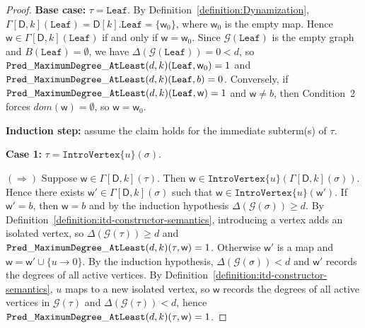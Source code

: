 \documentclass[11pt,a4paper]{article}
\newcommand{\falsevalue}{0}
\newcommand{\truevalue}{1}
\newcommand{\treewidthvalue}{k}
\newcommand{\decompositiongraph}[1]{\mathcal{G}(#1)}
\newcommand{\maxDegree}{\Delta}
\newcommand{\introvertextype}[1]{\mathtt{IntroVertex}\{#1\}}
\newcommand{\leaftype}{\mathtt{Leaf}}
\newcommand{\initialsetgeneric}{\mathtt{Leaf}}
\newcommand{\topbagname}{B}
\newcommand{\topbag}[1]{\topbagname(#1)}
\newcommand{\abstractdecomposition}{\tau}
\newcommand{\sigmaabstractdecomposition}{\sigma}
\newcommand{\vertexone}{u}
\newcommand{\awitness}{\mathsf{w}}
\newcommand{\dpcore}{\mathsf{D}}
\newcommand{\dpNamePart}[1]{\mbox{\normalfont\ttfamily #1}}
\newcommand{\predicateMaxDegree}[2]{\dpNamePart{Pred}\_\allowbreak\dpNamePart{MaximumDegree}\_\allowbreak\dpNamePart{AtLeast}(#1,#2)}
\newcommand{\dynamizationfunctionname}[1]{\Gamma[{#1}]}
\newcommand{\dynamizationfunction}[2]{\dynamizationfunctionname{#1,#2}}
\newcommand{\domain}{dom}
\newcommand{\maxdegreeparameter}{d}
\newcommand{\maxdegreefound}{b}
\newcommand{\mxdp}{\predicateMaxDegree{\maxdegreeparameter}{\treewidthvalue}}
\begin{document}
{\begin{proof}
\medskip
\noindent\textbf{Base case:} $\abstractdecomposition=\leaftype$. By Definition~\ref{definition:Dynamization}, $\dynamizationfunction{\dpcore}{\treewidthvalue}(\leaftype)=\dpcore[\treewidthvalue].\initialsetgeneric=\{\awitness_0\}$, where $\awitness_0$ is the empty map. Hence $\awitness\in \dynamizationfunction{\dpcore}{\treewidthvalue}(\leaftype)$ if and only if $\awitness=\awitness_0$. Since $\decompositiongraph{\leaftype}$ is the empty graph and $\topbag{\leaftype}=\emptyset$, we have $\maxDegree(\decompositiongraph{\leaftype})=0<\maxdegreeparameter$, so $\mxdp(\leaftype,\awitness_0)=\truevalue$ and $\mxdp(\leaftype,\maxdegreefound)=\falsevalue$. Conversely, if $\mxdp(\leaftype,\awitness)=\truevalue$ and $\awitness\neq\maxdegreefound$, then Condition~2 forces $\domain(\awitness)=\emptyset$, so $\awitness=\awitness_0$.

\medskip
\noindent\textbf{Induction step:} assume the claim holds for the immediate subterm(s) of $\abstractdecomposition$.

\medskip
\noindent\textbf{Case 1:} $\abstractdecomposition=\introvertextype{\vertexone}(\sigmaabstractdecomposition)$.

$(\Rightarrow)$ Suppose $\awitness\in \dynamizationfunction{\dpcore}{\treewidthvalue}\allowbreak(\abstractdecomposition)$. Then $\awitness\in \introvertextype{\vertexone}(\dynamizationfunction{\dpcore}{\treewidthvalue}\allowbreak(\sigmaabstractdecomposition))$. Hence there exists $\awitness'\in \dynamizationfunction{\dpcore}{\treewidthvalue}\allowbreak(\sigmaabstractdecomposition)$ such that $\awitness\in \introvertextype{\vertexone}(\awitness')$. If $\awitness'=\maxdegreefound$, then $\awitness=\maxdegreefound$ and by the induction hypothesis $\maxDegree(\decompositiongraph{\sigmaabstractdecomposition})\ge \maxdegreeparameter$. By Definition~\ref{definition:itd-constructor-semantics}, introducing a vertex adds an isolated vertex, so $\maxDegree(\decompositiongraph{\abstractdecomposition})\ge \maxdegreeparameter$ and $\mxdp(\abstractdecomposition,\awitness)=\truevalue$. Otherwise $\awitness'$ is a map and $\awitness=\awitness'\cup\{\vertexone\to 0\}$. By the induction hypothesis, $\maxDegree(\decompositiongraph{\sigmaabstractdecomposition})<\maxdegreeparameter$ and $\awitness'$ records the degrees of all active vertices. By Definition~\ref{definition:itd-constructor-semantics}, $\vertexone$ maps to a new isolated vertex, so $\awitness$ records the degrees of all active vertices in $\decompositiongraph{\abstractdecomposition}$ and $\maxDegree(\decompositiongraph{\abstractdecomposition})<\maxdegreeparameter$, hence $\mxdp(\abstractdecomposition,\awitness)=\truevalue$.


\end{proof}}
\end{document}
